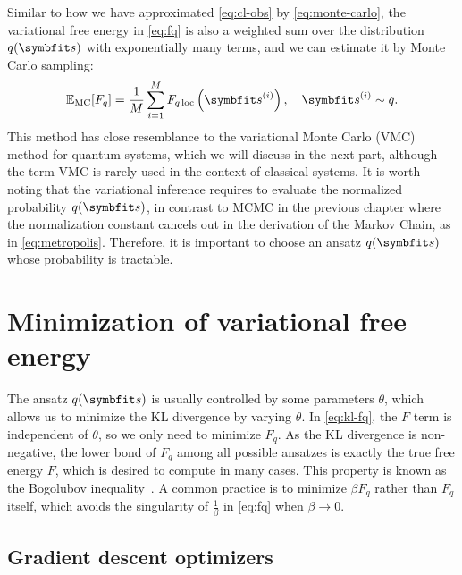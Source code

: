 Similar to how we have approximated \cref{eq:cl-obs} by \cref{eq:monte-carlo}, the variational free energy in \cref{eq:fq} is also a weighted sum over the distribution $q(\vs)$ with exponentially many terms, and we can estimate it by Monte Carlo sampling:
\begin{equation}
\bbE_\text{MC}[F_q] = \frac{1}{M} \sum_{i = 1}^M F_{q\,\text{loc}}\left( \vs^{(i)} \right), \quad
\vs^{(i)} \sim q.
\label{eq:fq-monte-carlo}
\end{equation}
This method has close resemblance to the variational Monte Carlo (VMC) method for quantum systems, which we will discuss in the next part, although the term VMC is rarely used in the context of classical systems. It is worth noting that the variational inference requires to evaluate the normalized probability $q(\vs)$, in contrast to MCMC in the previous chapter where the normalization constant cancels out in the derivation of the Markov Chain, as in \cref{eq:metropolis}. Therefore, it is important to choose an ansatz $q(\vs)$ whose probability is tractable.

\section{Minimization of variational free energy}

The ansatz $q(\vs)$ is usually controlled by some parameters $\theta$, which allows us to minimize the KL divergence by varying $\theta$. In \cref{eq:kl-fq}, the $F$ term is independent of $\theta$, so we only need to minimize $F_q$. As the KL divergence is non-negative, the lower bond of $F_q$ among all possible ansatzes is exactly the true free energy $F$, which is desired to compute in many cases. This property is known as the Bogolubov inequality~\cite{bogolubov1966model}. A common practice is to minimize $\beta F_q$ rather than $F_q$ itself, which avoids the singularity of $\frac{1}{\beta}$ in \cref{eq:fq} when $\beta \to 0$.

\subsection{Gradient descent optimizers}


